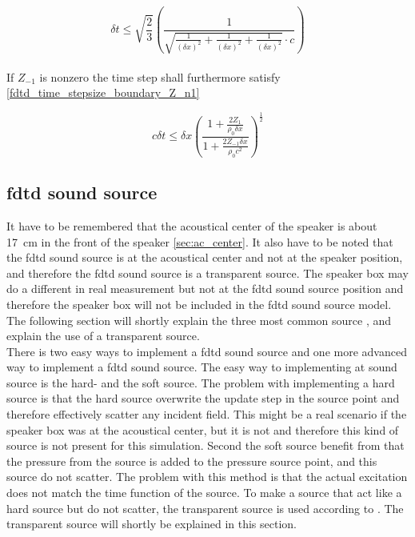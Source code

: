 \begin{equation}\label{fdtd_time_stepsize_boundary}
\delta t \leq \sqrt{\frac{2}{3}}  \left( \frac{1}{\sqrt{\frac{1}{(\delta x)^2}+\frac{1}{(\delta x)^2}+\frac{1}{(\delta x)^2} }\cdot c} \right)
\end{equation}\\


If $Z_{-1}$ is nonzero the time step shall furthermore satisfy \autoref{fdtd_time_stepsize_boundary_Z_n1}

\begin{equation}\label{fdtd_time_stepsize_boundary_Z_n1}
c \delta t \leq \delta x \left(   \frac{1+\frac{2Z_1}{\rho_0 \delta x}}{1+\frac{2Z_{-1} \delta x}{\rho_0 c^2}}  \right)^{\frac{1}{2}}
\end{equation}

\subsection{\gls{fdtd} sound source}
It have to be remembered that the acoustical center of the speaker is about \SI{17}{\centi\meter} in the front of the speaker \autoref{sec:ac_center}. It also have to be noted that the \gls{fdtd} sound source is at the acoustical center and not at the speaker position, and therefore the \gls{fdtd} sound source is a transparent source. The speaker box may do a different in real measurement but not at the \gls{fdtd} sound source position and therefore the speaker box will not be included in the \gls{fdtd} sound source model. The following section will shortly explain the three most common source \citep{FDTDsource},  and explain the use of a transparent source. \\

There is two easy ways to implement a \gls{fdtd} sound source and one more advanced way to implement a \gls{fdtd} sound source. The easy way to implementing at sound source is the hard- and the soft source. The problem with implementing a hard source is that the hard source overwrite the update step in the source point and therefore effectively scatter any incident field. This might be a real scenario if the speaker box was at the acoustical center, but it is not and therefore this kind of source is not present for this simulation. Second the soft source benefit from that the pressure from the source is added to the pressure source point, and this source do not scatter. The problem with this method is that the actual excitation does not match the time function of the source. To make a source that act like a hard source but do not scatter, the transparent source is used according to \citep{FDTDtransparent}. The transparent source will shortly be explained in this section. \\



